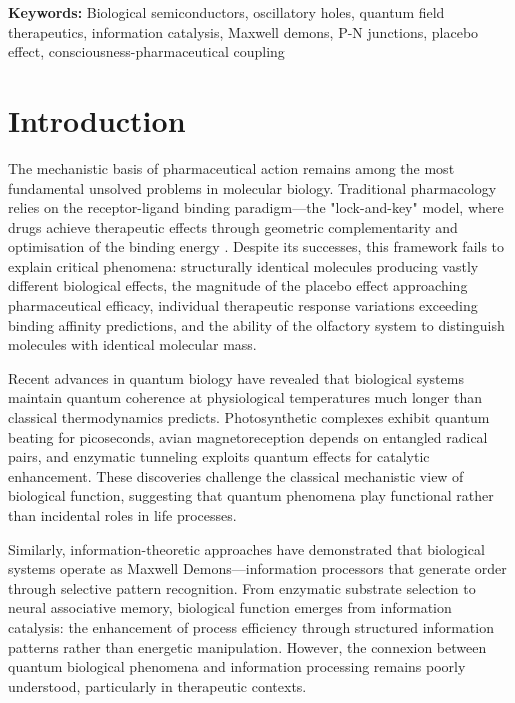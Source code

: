 \documentclass{article}
\theoremstyle{definition}
\theoremstyle{remark}
\begin{document}
\noindent\textbf{Keywords:} Biological semiconductors, oscillatory holes, quantum field therapeutics, information catalysis, Maxwell demons, P-N junctions, placebo effect, consciousness-pharmaceutical coupling

\tableofcontents

\section{Introduction}

The mechanistic basis of pharmaceutical action remains among the most fundamental unsolved problems in molecular biology. Traditional pharmacology relies on the receptor-ligand binding paradigm—the "lock-and-key" model, where drugs achieve therapeutic effects through geometric complementarity and optimisation of the binding energy \cite{Lengauer1996,Kitchen2004}. Despite its successes, this framework fails to explain critical phenomena: structurally identical molecules producing vastly different biological effects, the magnitude of the placebo effect approaching pharmaceutical efficacy, individual therapeutic response variations exceeding binding affinity predictions, and the ability of the olfactory system to distinguish molecules with identical molecular mass\cite{Turin1996,Keller2004}.

Recent advances in quantum biology have revealed that biological systems maintain quantum coherence at physiological temperatures much longer than classical thermodynamics predicts\cite{Engel2007,Lambert2013}. Photosynthetic complexes exhibit quantum beating for picoseconds\cite{Engel2007}, avian magnetoreception depends on entangled radical pairs\cite{Hore2016}, and enzymatic tunneling exploits quantum effects for catalytic enhancement\cite{Klinman2013}. These discoveries challenge the classical mechanistic view of biological function, suggesting that quantum phenomena play functional rather than incidental roles in life processes.

Similarly, information-theoretic approaches have demonstrated that biological systems operate as Maxwell Demons—information processors that generate order through selective pattern recognition\cite{Landauer1961,Bennett1982}. From enzymatic substrate selection to neural associative memory, biological function emerges from information catalysis: the enhancement of process efficiency through structured information patterns rather than energetic manipulation\cite{Monod1972,Hopfield1982}. However, the connexion between quantum biological phenomena and information processing remains poorly understood, particularly in therapeutic contexts.
\end{document}
